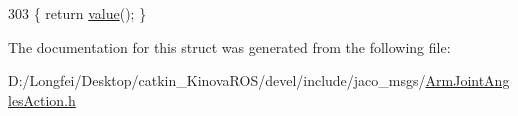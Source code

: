 \begin{DoxyCode}
303 \{ \textcolor{keywordflow}{return} \hyperlink{structros_1_1message__traits_1_1Definition_3_01_1_1jaco__msgs_1_1ArmJointAnglesAction___3_01ContainerAllocator_01_4_01_4_a1fbfdc5b04529df88abb7a2f1246e187}{value}(); \}
\end{DoxyCode}


The documentation for this struct was generated from the following file\+:\begin{DoxyCompactItemize}
\item 
D\+:/\+Longfei/\+Desktop/catkin\+\_\+\+Kinova\+R\+O\+S/devel/include/jaco\+\_\+msgs/\hyperlink{ArmJointAnglesAction_8h}{Arm\+Joint\+Angles\+Action.\+h}\end{DoxyCompactItemize}
